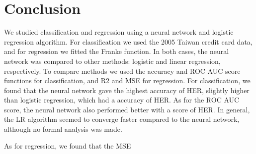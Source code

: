 \section{Conclusion}
\label{sec:conclusion}

We studied classification and regression using a neural network and logistic regression
algorithm. For classification we used the 2005 Taiwan credit card data,
and for regression we fitted the Franke function. In both cases, the neural network
was compared to other methods: logistic and linear regression, respectively.
To compare methods we used the accuracy and ROC AUC score functions for classification,
and R2 and MSE for regression. For classification, we found that the neural network gave
the highest accuracy of HER, slightly higher than logistic regression, which had a
accuracy of HER. As for the ROC AUC score, the neural network also performed better
with a score of HER. In general, the LR algorithm seemed to converge faster compared to
the neural network, although no formal analysis was made.

As for regression, we found that the MSE
